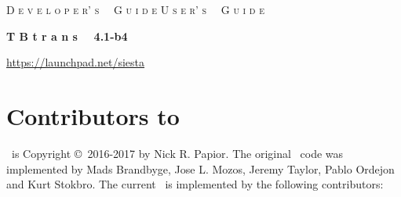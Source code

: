 %
%
%
%



\date{July 5, 2017}




\begin{titlepage}

\begin{center}

\vspace{1cm}
\ifdeveloper
 {\Huge \textsc{D e v e l o p e r' s \, \, G u i d e}}
\else
 {\Huge \textsc{U s e r' s \, \, G u i d e}}
\fi

\vspace{1cm}
\hrulefill
\vspace{1cm}

{\Huge \textbf{T B t r a n s \, \, 4.1-b4}}

\vspace{1cm}
\hrulefill
\vspace{0.5cm}

{\Large \printdate}

\vspace{1.5cm}
{\Large \url{https://launchpad.net/siesta}}

\end{center}

\end{titlepage}


\newpage

\section*{Contributors to \tbtrans}

\tbtrans\ is Copyright \copyright\ 2016-2017 by Nick R. Papior. The
original \tbtrans\ code was implemented by Mads Brandbyge, Jose
L. Mozos, Jeremy Taylor, Pablo Ordejon and Kurt Stokbro. The current
\tbtrans\ is implemented by the following contributors:

